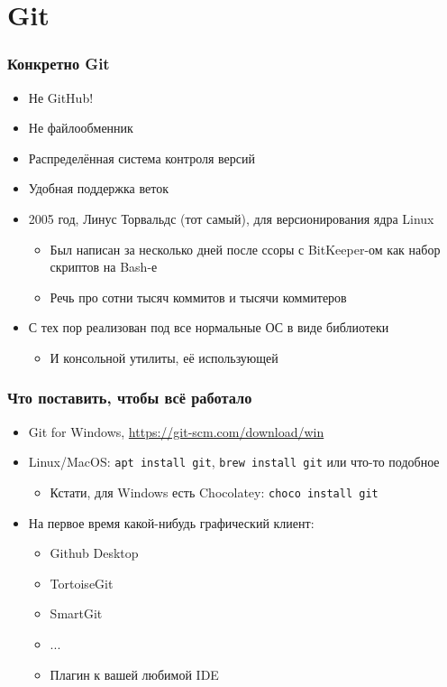 \documentclass{../../slides-style}
\begin{document}
    \section{Git}

    \begin{frame}
        \frametitle{Конкретно Git}
        \begin{itemize}
            \item Не GitHub!
            \item Не файлообменник
            \item Распределённая система контроля версий
            \item Удобная поддержка веток
            \item 2005 год, Линус Торвальдс (тот самый), для версионирования ядра Linux
            \begin{itemize}
                \item Был написан за несколько дней после ссоры с BitKeeper-ом как набор скриптов на Bash-е
                \item Речь про сотни тысяч коммитов и тысячи коммитеров
            \end{itemize}
            \item С тех пор реализован под все нормальные ОС в виде библиотеки 
            \begin{itemize}
                \item И консольной утилиты, её использующей
            \end{itemize} 
        \end{itemize}
    \end{frame}

    \begin{frame}[fragile]
        \frametitle{Что поставить, чтобы всё работало}
        \begin{itemize}
            \item Git for Windows, \url{https://git-scm.com/download/win}
            \item Linux/MacOS: \verb|apt install git|, \verb|brew install git| или что-то подобное
            \begin{itemize}
                \item Кстати, для Windows есть Chocolatey: \verb|choco install git|
            \end{itemize}
            \item На первое время какой-нибудь графический клиент:
            \begin{itemize}
                \item Github Desktop
                \item TortoiseGit
                \item SmartGit 
                \item ...
                \item Плагин к вашей любимой IDE
            \end{itemize}
        \end{itemize}
    \end{frame}
\end{document}
